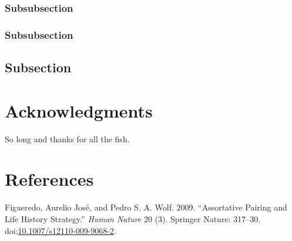 \documentclass[fleqn,10pt,lineno]{wlpeerj} %
\theoremstyle{definition}
\theoremstyle{definition}
\theoremstyle{definition}
\theoremstyle{remark}
\begin{document}
\lipsum[11] 

\subsubsection*{Subsubsection}\label{subsubsection}

\lipsum[12] 

\subsubsection*{Subsubsection}\label{subsubsection-1}

\lipsum[14] 

\subsection*{Subsection}\label{subsection-3}

\lipsum[15-20] 

\section*{Acknowledgments}\label{acknowledgments}

So long and thanks for all the fish.

\section*{References}\label{references}

\hypertarget{refs}{}
\hypertarget{ref-Figueredo:2009dg}{}
Figueredo, Aurelio José, and Pedro S. A. Wolf. 2009. ``Assortative
Pairing and Life History Strategy.'' \emph{Human Nature} 20 (3).
Springer Nature: 317--30.
doi:\href{https://doi.org/10.1007/s12110-009-9068-2}{10.1007/s12110-009-9068-2}.
\end{document}
